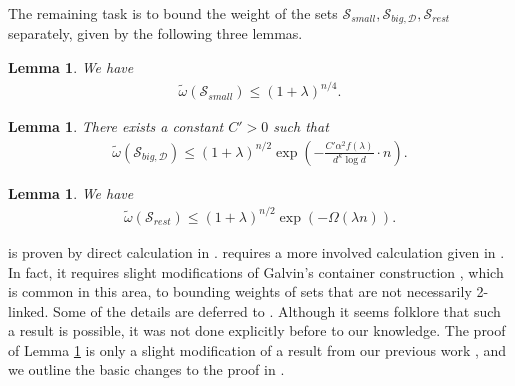 \documentclass[reqno,a4paper,11pt]{amsart}
\newtheorem{lemma}[theorem]{Lemma}
\newcommand{\cD}{\mathcal{D}}
\newcommand{\cS}{\mathcal{S}}
\newcommand{\lam}{\lambda}
\newcommand{\ex}{\kappa}
\begin{document}
The remaining task is to bound the weight of the sets $\cS_{small}, \cS_{big, \cD}, \cS_{rest}$ separately, given by the following three lemmas.

\begin{lemma} \label{lem:small}
We have
\begin{align*}
    \tilde{\omega}(\cS_{small}) \leq (1+\lambda)^{n/4}.
\end{align*}
\end{lemma}

\begin{lemma} \label{lem:middle}
There exists a constant $C'>0$ such that
\begin{align*}
    \tilde{\omega}(\cS_{big, \cD}) \leq (1+\lambda)^{n/2} \exp\left( - \frac{C' \alpha^2 f(\lam)}{d^{\ex} \log d} \cdot n \right).
\end{align*}
\end{lemma}

\begin{lemma} \label{lem:rest}
We have
\begin{align*}
    \tilde{\omega}(\cS_{rest}) \leq (1+\lambda)^{n/2} \exp(-\Omega(\lam n)).
\end{align*}
\end{lemma}

 is proven by direct calculation in .  requires a more involved calculation given in . In fact, it requires slight modifications of Galvin's container construction \cite{galvin2011threshold, galvin2019independent}, which is common in this area, to bounding weights of sets that are not necessarily 2-linked. Some of the details are deferred to . Although it seems folklore that such a result is possible, it was not done explicitly before to our knowledge. The proof of Lemma \ref{lem:rest} is only a slight modification of a result from our previous work \cite[Lemma 7.1]{GeKaSaWdo25}, and we outline the basic changes to the proof in .
\end{document}

